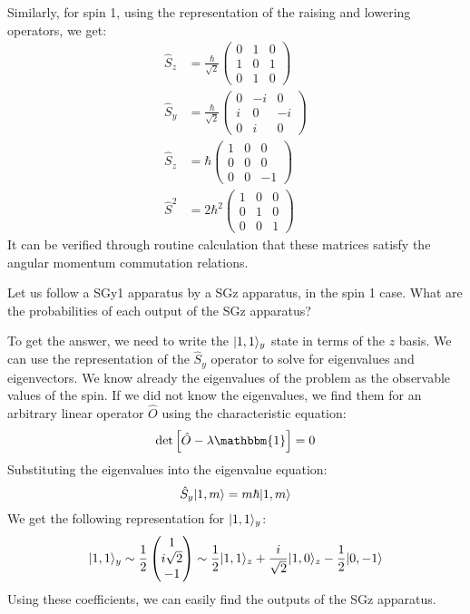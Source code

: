 Similarly, for spin 1, using the representation of the raising and lowering operators, we get:
\begin{subequations}
	\begin{align}
		\hat S_z &= \frac{\hbar}{\sqrt{2}} \begin{pmatrix}
			0 & 1 & 0 \\
			1 & 0 & 1 \\
			0 & 1 & 0 
		\end{pmatrix}\\
		\hat S_y & = \frac{\hbar}{\sqrt{2}} \begin{pmatrix}
			0 & -i & 0 \\
			i & 0 & -i \\
			0 & i & 0 
		\end{pmatrix}\\
		\hat S_z & = \hbar \begin{pmatrix}
			1 & 0 & 0\\
			0 & 0 & 0\\
			0 & 0 & -1
		\end{pmatrix}\\
		\hat S^2 & = 2\hbar^2 \begin{pmatrix}
			1 & 0 & 0\\
			0 & 1 & 0\\
			0 & 0 & 1
		\end{pmatrix}
	\end{align}
\end{subequations}
It can be verified through routine calculation that these matrices satisfy the angular momentum commutation relations.

\begin{aside}
	Let us follow a SGy1 apparatus by a SGz apparatus, in the spin 1 case. What are the probabilities of each output of the SGz apparatus?

	To get the answer, we need to write the \(\lvert1,1\rangle_y\) state in terms of the \(z\) basis. We can use the representation of the \(\hat S_y\) operator to solve for eigenvalues and eigenvectors. We know already the eigenvalues of the problem as the observable values of the spin. If we did not know the eigenvalues, we find them for an arbitrary linear operator \(\hat{O}\) using the characteristic equation:
	\begin{equation}
		\det\left[\hat{O}-\lambda \mathbbm{1}\right]=0
	\end{equation}
	Substituting the eigenvalues into the eigenvalue equation:
	\[\hat S_y \lvert1,m\rangle= m\hbar \lvert1,m\rangle\]
	We get the following representation for \(\lvert1,1\rangle_y\):
	\[\lvert1,1\rangle_y\sim\frac{1}{2} \begin{pmatrix}
		1 \\ i\sqrt{2} \\ -1
	\end{pmatrix}\sim\frac{1}{2}\lvert1,1\rangle_z + \frac{i}{\sqrt{2}}\lvert1,0\rangle_z -\frac{1}{2}\lvert0,-1\rangle\]
	Using these coefficients, we can easily find the outputs of the SGz apparatus.
\end{aside}

